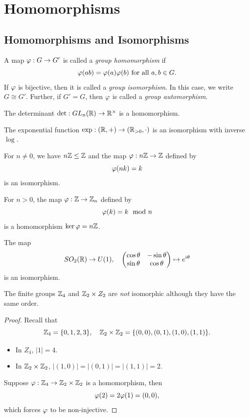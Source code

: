 \chapter{Homomorphisms}

\section{Homomorphisms and Isomorphisms}

\begin{definition}
  A map \(\varphi:G\to G'\) is called a \emph{group homomorphism} if \[
    \varphi(ab) = \varphi(a)\varphi(b) \text{ for all } a,b\in G.
  \]
  If \(\varphi\) is bijective, then it is called a \emph{group isomorphism}. In this case, we write \(G\cong G'\). Further, if \(G' = G\), then \(\varphi\) is called a \emph{group automorphism}.
\end{definition}

\begin{example}
  The determinant \(\det:GL_n(\mathbb{R})\to \mathbb{R}^\times\) is a homomorphism.
\end{example}

\begin{example}
  The exponential function \(\exp:(\mathbb{R},+)\to (\mathbb{R}_{>0}, \cdot)\) is an isomorphism with inverse \(\log\).
\end{example}

\begin{example}
  For \(n\neq 0\), we have \(n\mathbb{Z}\leq\mathbb{Z}\) and the map \(\varphi:n\mathbb{Z}\to\mathbb{Z}\) defined by \[
    \varphi(nk) = k
  \] is an isomorphism.
\end{example}

\begin{example}
  For \(n > 0\), the map \(\varphi:\mathbb{Z}\to\mathbb{Z}_n\) defined by \[
    \varphi(k) = k\mod n
  \] is a homomorphism \(\ker\varphi = n\mathbb{Z}\).
\end{example}

\begin{example}
  The map \[
    SO_2(\mathbb{R})\to U(1), \quad
    \begin{pmatrix}
      \cos\theta & -\sin\theta \\
      \sin\theta & \cos\theta
    \end{pmatrix}\mapsto e^{i\theta}
  \] is an isomorphism.
\end{example}

\begin{example}
  The finite groups \(\mathbb{Z}_4\) and \(\mathbb{Z}_2\times Z_2\) are \emph{not} isomorphic although they have the same order.
\end{example}
\begin{proof}
  Recall that \[
    \mathbb{Z}_4 = \{0,1,2,3\}, \quad
    \mathbb{Z}_2\times\mathbb{Z}_2 = \{(0,0),(0,1),(1,0),(1,1)\}.
  \]
  \begin{itemize}
    \item In \(Z_4\), \(|1| = 4\).
    \item In \(\mathbb{Z}_2\times\mathbb{Z}_2\), \(|(1,0)| = |(0,1)| = |(1,1)| = 2\).
  \end{itemize}
  Suppose \(\varphi:\mathbb{Z}_4\to\mathbb{Z}_2\times\mathbb{Z}_2\) is a homomorphism, then \[
    \varphi(2) = 2\varphi(1) = (0,0),
  \] which forces \(\varphi\) to be non-injective.
\end{proof}

